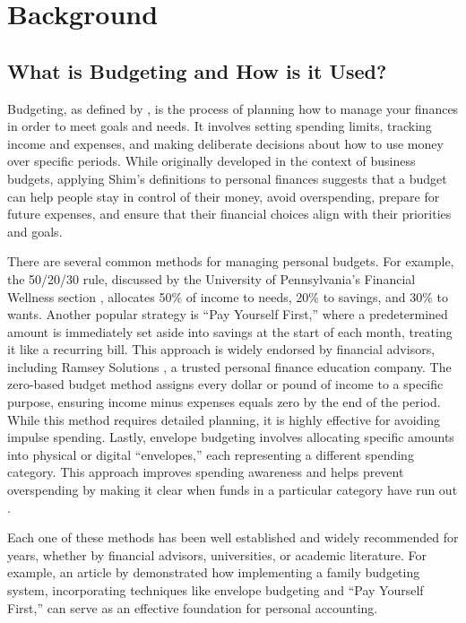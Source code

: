 \documentclass{l4proj}
\begin{document}
\chapter{Background}

\section{What is Budgeting and How is it Used?}
Budgeting, as defined by \citet{shim_budgeting_2011}, is the process of planning how to manage your finances in order to meet goals and needs. It involves setting spending limits, tracking income and expenses, and making deliberate decisions about how to use money over specific periods. While originally developed in the context of business budgets, applying Shim’s definitions to personal finances suggests that a budget can help people stay in control of their money, avoid overspending, prepare for future expenses, and ensure that their financial choices align with their priorities and goals.

There are several common methods for managing personal budgets. For example, the 50/20/30 rule, discussed by the University of Pennsylvania’s Financial Wellness section \citep{pen_popular_budget}, allocates 50\% of income to needs, 20\% to savings, and 30\% to wants. Another popular strategy is “Pay Yourself First,” where a predetermined amount is immediately set aside into savings at the start of each month, treating it like a recurring bill. This approach is widely endorsed by financial advisors, including Ramsey Solutions \citep{rams_how_2024}, a trusted personal finance education company. The zero-based budget method assigns every dollar or pound of income to a specific purpose, ensuring income minus expenses equals zero by the end of the period. While this method requires detailed planning, it is highly effective for avoiding impulse spending. Lastly, envelope budgeting involves allocating specific amounts into physical or digital “envelopes,” each representing a different spending category. This approach improves spending awareness and helps prevent overspending by making it clear when funds in a particular category have run out \citep{rams_envelope_2024}.

Each one of these methods has been well established and widely recommended for years, whether by financial advisors, universities, or academic literature. For example, an article by \citet{gorshkova_nv_and_mytareva_leyla_and_perekrestova_lv_and_glushchenko_av_and_fisher_ov_system_2015} demonstrated how implementing a family budgeting system, incorporating techniques like envelope budgeting and “Pay Yourself First,” can serve as an effective foundation for personal accounting. 
\end{document}
